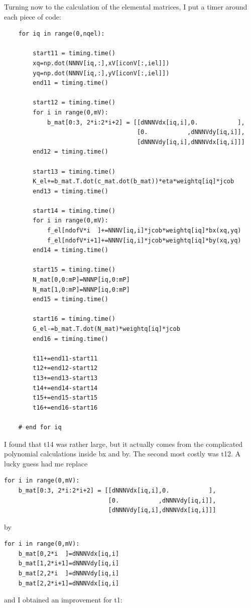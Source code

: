 Turning now to the calculation of the elemental matrices, 
I put a timer around each piece of code:
\begin{lstlisting}
    for iq in range(0,nqel):

        start11 = timing.time()
        xq=np.dot(NNNV[iq,:],xV[iconV[:,iel]])
        yq=np.dot(NNNV[iq,:],yV[iconV[:,iel]])
        end11 = timing.time()

        start12 = timing.time()
        for i in range(0,mV):
            b_mat[0:3, 2*i:2*i+2] = [[dNNNVdx[iq,i],0.           ],
                                     [0.           ,dNNNVdy[iq,i]],
                                     [dNNNVdy[iq,i],dNNNVdx[iq,i]]]
        end12 = timing.time()

        start13 = timing.time()
        K_el+=b_mat.T.dot(c_mat.dot(b_mat))*eta*weightq[iq]*jcob
        end13 = timing.time()

        start14 = timing.time()
        for i in range(0,mV):
            f_el[ndofV*i  ]+=NNNV[iq,i]*jcob*weightq[iq]*bx(xq,yq)
            f_el[ndofV*i+1]+=NNNV[iq,i]*jcob*weightq[iq]*by(xq,yq)
        end14 = timing.time()

        start15 = timing.time()
        N_mat[0,0:mP]=NNNP[iq,0:mP]
        N_mat[1,0:mP]=NNNP[iq,0:mP]
        end15 = timing.time()

        start16 = timing.time()
        G_el-=b_mat.T.dot(N_mat)*weightq[iq]*jcob
        end16 = timing.time()

        t11+=end11-start11
        t12+=end12-start12
        t13+=end13-start13
        t14+=end14-start14
        t15+=end15-start15
        t16+=end16-start16

    # end for iq
\end{lstlisting}
I found that t14 was rather large, but it actually comes from 
the complicated polynomial calculations inside bx and by. 
The second most costly was t12. A lucky guess had me replace
\begin{lstlisting}
for i in range(0,mV):
    b_mat[0:3, 2*i:2*i+2] = [[dNNNVdx[iq,i],0.           ],
                             [0.           ,dNNNVdy[iq,i]],
                             [dNNNVdy[iq,i],dNNNVdx[iq,i]]]
\end{lstlisting}
by 
\begin{lstlisting}
for i in range(0,mV):
    b_mat[0,2*i  ]=dNNNVdx[iq,i]
    b_mat[1,2*i+1]=dNNNVdy[iq,i]
    b_mat[2,2*i  ]=dNNNVdy[iq,i]
    b_mat[2,2*i+1]=dNNNVdx[iq,i]
\end{lstlisting}
and I obtained an improvement for t1:
